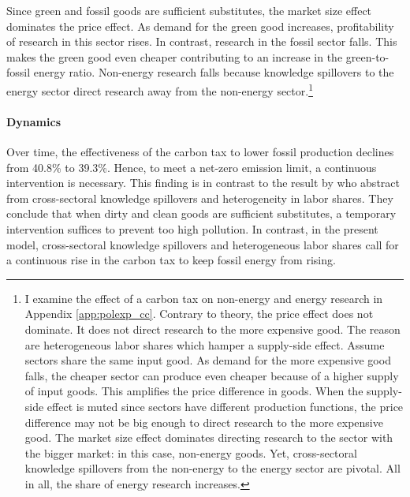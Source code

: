 Since green and fossil goods are sufficient substitutes, the market size effect dominates the price effect. As demand for the green good increases, profitability of research in  this sector rises. In contrast, research in the fossil sector falls. This makes the green good even cheaper contributing to an increase in the green-to-fossil energy ratio.
Non-energy research falls because knowledge spillovers to the energy sector direct research away from the non-energy sector.\footnote{ I examine the effect of a carbon tax on non-energy and energy research in Appendix \ref{app:polexp_cc}. Contrary to theory, the price effect does not dominate. It does not direct research to the more expensive good. The reason are heterogeneous labor shares which hamper a supply-side effect. Assume sectors share the same input good. As demand for the more expensive good falls, the cheaper sector can produce even cheaper because of a higher supply of input goods. This amplifies the price difference in goods. When the supply-side effect is muted since sectors have different production functions, the price difference may not be big enough to direct research to the more expensive good. The market size effect dominates directing research to the sector with the bigger market: in this case, non-energy goods. Yet, cross-sectoral knowledge spillovers from the non-energy to the energy sector are pivotal. All in all, the share of energy research increases.}

\paragraph{Dynamics}

Over time, the effectiveness of the carbon tax to lower fossil production declines from 40.8\% to 39.3\%. Hence, to meet a net-zero emission limit, a continuous intervention is necessary. 
This finding is in contrast to the result by \cite{Acemoglu2012TheChange} who abstract from cross-sectoral knowledge spillovers and heterogeneity in labor shares. They conclude that when dirty and clean goods are sufficient substitutes, a temporary intervention suffices to prevent too high pollution. In contrast, in the present model, cross-sectoral knowledge spillovers and heterogeneous labor shares 
call for a continuous rise in the carbon tax to keep fossil energy from rising. 

